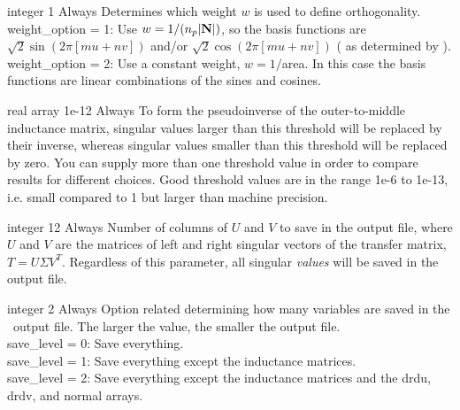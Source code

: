 \myhrule

{integer}
{1}
{Always}
{Determines which weight $w$ is used to define orthogonality.\\

{\ttfamily weight\_option} = 1: Use $w = 1 / (n_p |{\mathbf N}|)$, so the basis functions
are $\sqrt{2} \sin(2\pi[mu+nv])$ and/or $\sqrt{2} \cos(2\pi[mu+nv])$ (
as determined by ).\\

{\ttfamily weight\_option} = 2: Use a constant weight, $w = 1/$area. In this case the basis functions
are linear combinations of the sines and cosines.
}

\myhrule

{real array}
{1e-12}
{Always}
{To form the pseudoinverse of the outer-to-middle inductance matrix, singular values larger than this threshold
will be replaced by their inverse, whereas singular values smaller than this threshold will be replaced by zero.
You can supply more than one threshold value in order to compare results for different choices.
Good threshold values are in the range 1e-6 to 1e-13, i.e. small compared to 1 but larger than machine precision.}

\myhrule

{integer}
{12}
{Always}
{Number of columns of $U$ and $V$ to save in the output file, where $U$ and $V$ are the matrices of left and right singular vectors of the transfer matrix,
$T = U\Sigma V^{T}$.
Regardless of this parameter, all singular \emph{values} will be saved in the output file.}

\myhrule

{integer}
{2}
{Always}
{Option related determining how many variables are saved in the \netCDF~output file.  The larger the value, the smaller the output file.\\

{\ttfamily save\_level} = 0: Save everything.\\

{\ttfamily save\_level} = 1: Save everything except the inductance matrices.\\

{\ttfamily save\_level} = 2: Save everything except the inductance matrices and the {\ttfamily drdu}, {\ttfamily drdv}, and {\ttfamily normal} arrays.
}

